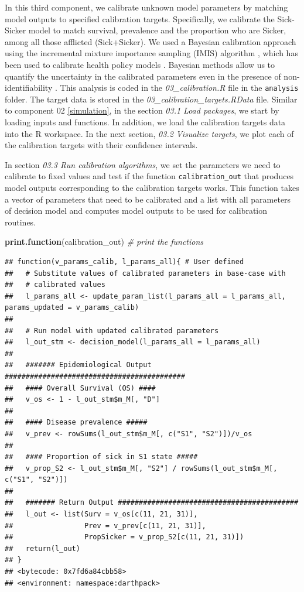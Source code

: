 \documentclass[]{book}
\newenvironment{Shaded}{\begin{snugshade}}{\end{snugshade}}
\newcommand{\KeywordTok}[1]{\textcolor[rgb]{0.13,0.29,0.53}{\textbf{#1}}}
\newcommand{\CommentTok}[1]{\textcolor[rgb]{0.56,0.35,0.01}{\textit{#1}}}
\newcommand{\NormalTok}[1]{#1}
\begin{document}
In this third component, we calibrate unknown model parameters by
matching model outputs to specified calibration targets. Specifically,
we calibrate the Sick-Sicker model to match survival, prevalence and the
proportion who are Sicker, among all those afflicted (Sick+Sicker). We
used a Bayesian calibration approach using the incremental mixture
importance sampling (IMIS) algorithm \citep{Steele2006}, which has been
used to calibrate health policy models \citep[\citet{Menzies2017},
\citet{Rutter2018}]{Raftery2010}. Bayesian methods allow us to quantify
the uncertainty in the calibrated parameters even in the presence of
non-identifiability \citep{Alarid-Escudero2018b}. This analysis is coded
in the \emph{03\_calibration.R} file in the \texttt{analysis} folder.
The target data is stored in the \emph{03\_calibration\_targets.RData}
file. Similar to component 02 \ref{simulation}, in the section
\emph{03.1 Load packages}, we start by loading inputs and functions. In
addition, we load the calibration targets data into the R workspace. In
the next section, \emph{03.2 Visualize targets}, we plot each of the
calibration targets with their confidence intervals.

In section \emph{03.3 Run calibration algorithms}, we set the parameters
we need to calibrate to fixed values and test if the function
\texttt{calibration\_out} that produces model outputs corresponding to
the calibration targets works. This function takes a vector of
parameters that need to be calibrated and a list with all parameters of
decision model and computes model outputs to be used for calibration
routines.

\begin{Shaded}
\begin{Highlighting}[]
\KeywordTok{print.function}\NormalTok{(calibration_out) }\CommentTok{# print the functions}
\end{Highlighting}
\end{Shaded}

\begin{verbatim}
## function(v_params_calib, l_params_all){ # User defined
##   # Substitute values of calibrated parameters in base-case with 
##   # calibrated values
##   l_params_all <- update_param_list(l_params_all = l_params_all, params_updated = v_params_calib)
##   
##   # Run model with updated calibrated parameters
##   l_out_stm <- decision_model(l_params_all = l_params_all)
##   
##   ####### Epidemiological Output ###########################################
##   #### Overall Survival (OS) ####
##   v_os <- 1 - l_out_stm$m_M[, "D"]
##   
##   #### Disease prevalence #####
##   v_prev <- rowSums(l_out_stm$m_M[, c("S1", "S2")])/v_os
##   
##   #### Proportion of sick in S1 state #####
##   v_prop_S2 <- l_out_stm$m_M[, "S2"] / rowSums(l_out_stm$m_M[, c("S1", "S2")])
##   
##   ####### Return Output ###########################################
##   l_out <- list(Surv = v_os[c(11, 21, 31)],
##                 Prev = v_prev[c(11, 21, 31)],
##                 PropSicker = v_prop_S2[c(11, 21, 31)])
##   return(l_out)
## }
## <bytecode: 0x7fd6a84cbb58>
## <environment: namespace:darthpack>
\end{verbatim}
\end{document}

